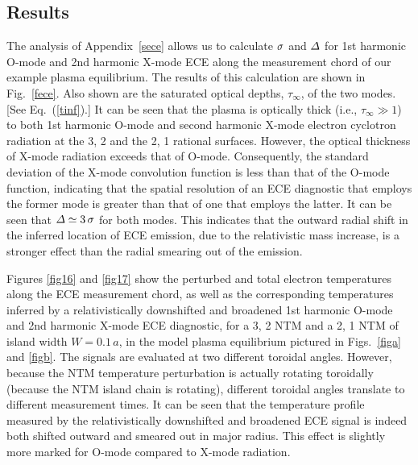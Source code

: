 \documentclass{iopjournal}
\begin{document}
{\subsection{Results}
The analysis of Appendix~\ref{sece} allows us to calculate ${\mit\sigma}$ and ${\mit\Delta}$ for 1st harmonic O-mode and 2nd harmonic X-mode ECE along the
measurement chord of our example plasma equilibrium. The results of this calculation are shown in Fig.~\ref{fece}. Also shown are the saturated optical
depths, $\tau_\infty$, of the two modes. [See Eq.~(\ref{tinf}).] It can be seen that the plasma is optically thick (i.e., $\tau_\infty\gg 1$) to both
1st harmonic O-mode and second harmonic X-mode electron cyclotron radiation at the 3, 2 and the 2, 1 rational surfaces. However, the optical thickness of X-mode
radiation exceeds that of O-mode. Consequently, the standard deviation of the X-mode convolution function is less than that of the O-mode
function, indicating that the spatial resolution of an ECE diagnostic that employs the former mode is greater than that of one that employs the latter. 
It can be seen that ${\mit\Delta}\simeq 3\,\sigma$ for both modes. This indicates that the outward radial shift in the inferred location of
ECE emission, due to the relativistic mass increase, is a stronger effect than the radial smearing out of the emission. 

Figures \ref{fig16} and \ref{fig17} show the perturbed and total electron temperatures along the ECE measurement chord, as well as the corresponding temperatures inferred by a relativistically 
downshifted and broadened 1st harmonic O-mode and 2nd harmonic X-mode  ECE diagnostic, for a
3, 2 NTM and a 2, 1 NTM of island width $W=0.1\,a$,  in the model plasma equilibrium pictured in Figs.~\ref{figa} and \ref{figb}. 
The signals are evaluated at two different toroidal angles. However, because the
NTM temperature perturbation is actually rotating toroidally (because the NTM island chain is rotating), different toroidal angles translate to different measurement times. It can be seen that the temperature profile measured by the relativistically downshifted and 
broadened ECE signal is indeed both shifted outward and  smeared out in major radius. This effect is slightly more marked for O-mode compared to X-mode radiation. 

}
\end{document}
